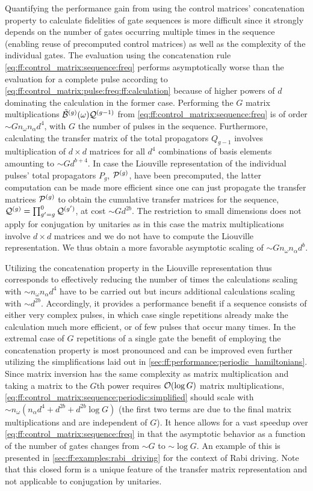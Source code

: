 Quantifying the performance gain from using the control matrices' concatenation property to calculate fidelities of gate sequences is more difficult since it strongly depends on the number of gates occurring multiple times in the sequence (enabling reuse of precomputed control matrices) as well as the complexity of the individual gates.
The evaluation using the concatenation rule \cref{eq:ff:control_matrix:sequence:freq} performs asymptotically worse than the evaluation for a complete pulse according to \cref{eq:ff:control_matrix:pulse:freq:ff:calculation} because of higher powers of $d$ dominating the calculation in the former case.
Performing the $G$ matrix multiplications $\tilde{\mathcal{B}}^{(g)}(\omega)\mathcal{Q}^{(g-1)}$ from \cref{eq:ff:control_matrix:sequence:freq} is of order $\sim G n_\omega n_\alpha d^4$, with $G$ the number of pulses in the sequence.
Furthermore, calculating the transfer matrix of the total propagators $Q_{g-1}$ involves multiplication of $d\times d$ matrices for all $d^4$ combinations of basis elements amounting to $\sim G d^{b+4}$.
In case the Liouville representation of the individual pulses' total propagators $P_g$, $\mathcal{P}^{(g)}$, have been precomputed, the latter computation can be made more efficient since one can just propagate the transfer matrices $\mathcal{P}^{(g)}$ to obtain the cumulative transfer matrices for the sequence, $\mathcal{Q}^{(g)}=\prod_{g^\prime=g}^0\mathcal{Q}^{(g^\prime)}$, at cost $\sim G d^{2b}$.
The restriction to small dimensions does not apply for conjugation by unitaries as in this case the matrix multiplications involve $d\times d$ matrices and we do not have to compute the Liouville representation.
We thus obtain a more favorable asymptotic scaling of $\sim G n_\omega n_\alpha d^b$.

Utilizing the concatenation property in the Liouville representation thus corresponds to effectively reducing the number of times the calculations scaling with $\sim n_\omega n_\alpha d^4$ have to be carried out but incurs additional calculations scaling with $\sim d^{2b}$.
Accordingly, it provides a performance benefit if a sequence consists of either very complex pulses, in which case single repetitions already make the calculation much more efficient, or of few pulses that occur many times.
In the extremal case of $G$ repetitions of a single gate the benefit of employing the concatenation property is most pronounced and can be improved even further utilizing the simplifications laid out in \cref{sec:ff:performance:periodic_hamiltonians}.
Since matrix inversion has the same complexity as matrix multiplication and taking a matrix to the $G$th power requires $\order{\log G}$ matrix multiplications, \cref{eq:ff:control_matrix:sequence:periodic:simplified} should scale with $\sim n_\omega (n_\alpha d^4 + d^{2b} + d^{2b}\log{G})$ (the first two terms are due to the final matrix multiplications and are independent of $G$).
It hence allows for a vast speedup over \cref{eq:ff:control_matrix:sequence:freq} in that the asymptotic behavior as a function of the number of gates changes from $\sim G$ to $\sim\log G$.
An example of this is presented in \cref{sec:ff:examples:rabi_driving} for the context of Rabi driving.
Note that this closed form is a unique feature of the transfer matrix representation and not applicable to conjugation by unitaries.
